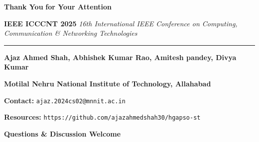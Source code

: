 \documentclass[aspectratio=169,12pt]{beamer}
\begin{document}
\begin{frame}
\vfill
\begin{center}
{\fontsize{25}{30}\selectfont\textcolor{primary}{\textbf{Thank You}} \textcolor{dark}{\textbf{\Large for Your Attention}}}

    
    \vspace{0.8cm}
    
    {\large\textcolor{primary}{\textbf{IEEE ICCCNT 2025}}}
    {\normalsize\textcolor{dark}{\textit{16th International IEEE Conference on Computing, Communication \& Networking Technologies}}}
    
    \vspace{0cm}
    
    \textcolor{primary}{\rule{0.6\textwidth}{2pt}}
    
    \vspace{0.8cm}
    
    {\normalsize\textbf{Ajaz Ahmed Shah, Abhishek Kumar Rao, Amitesh pandey, Divya Kumar}}
    

    
    {\small\textcolor{dark}{\textbf{Motilal Nehru National Institute of Technology, Allahabad}}}
    
    
    
    {\small\textcolor{dark}{\textbf{Contact:}} \texttt{ajaz.2024cs02@mnnit.ac.in}}
    
    {\small\textcolor{dark}{\textbf{Resources:}}} \texttt{https://github.com/ajazahmedshah30/hgapso-st}\\
    
    \vspace{0.7cm}
    
    {\large\textcolor{primary}{\textbf{Questions \& Discussion Welcome}}}
    
\end{center}
\vfill
\end{frame}
\end{document}
